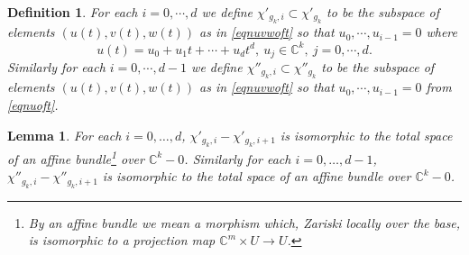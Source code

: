 \documentclass[11pt]{amsart}
\newtheorem{defn}[thm]{Definition}
\newtheorem{lemma}[thm]{Lemma}
\newcommand{\bC}{\mathbb{C}}
\numberwithin{equation}{section}
\newcommand{\C}{\mathbb C}
\begin{document}
\begin{defn} \label{defnchiprimeg}
	For each $i=0,\cdots,d$ we define $\chi'_{g_k,i} \subset \chi'_{g_k}$ to be the subspace of elements
	$(u(t),v(t),w(t))$ as in \eqref{eqnuvwoft} so that $u_0,\cdots,u_{i-1} = 0$ where
	\begin{equation} \label{eqnuoft}
		u(t) = u_0 + u_1 t + \cdots + u_d t^d, \ u_j \in \C^k, \ j=0,\cdots,d.
	\end{equation}
	Similarly for each $i=0,\cdots,d-1$ we define $\chi''_{g_k,i} \subset \chi''_{g_k}$ to be the subspace of elements
	$(u(t),v(t),w(t))$ as in \eqref{eqnuvwoft} so that $u_0,\cdots,u_{i-1} = 0$ from \eqref{eqnuoft}.
\end{defn}



\begin{lemma} \label{lemmaStrataFibration}
	For each $i= 0,\ldots,d$,
	$\chi'_{g_k,i}-\chi'_{g_k,i+1}$ is isomorphic to the total space of an affine bundle\footnote{By an \emph{affine bundle} we mean a morphism which, Zariski locally over the base, is isomorphic to a projection map $\bC^m \times U \to U$.} over $\bC^k-0$.
	Similarly for each $i = 0,\ldots,d-1$,
	$\chi''_{g_k,i}-\chi''_{g_k,i+1}$ is isomorphic to the total space of an affine bundle over $\bC^k-0$.
\end{lemma}
\end{document}
